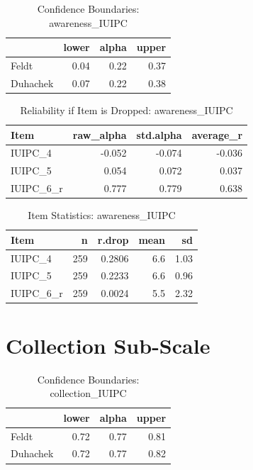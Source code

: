 \begin{table}[h]
\centering
\small
\caption{Confidence Boundaries: awareness\_IUIPC}
\label{tab:awareness_confidence}
\begin{tabular}{lrrr}
\toprule
 & \textbf{lower} & \textbf{alpha} & \textbf{upper} \\
\midrule
Feldt     & 0.04 & 0.22 & 0.37 \\
Duhachek  & 0.07 & 0.22 & 0.38 \\
\bottomrule
\end{tabular}
\end{table}

\begin{table}[h]
\centering
\small
\caption{Reliability if Item is Dropped: awareness\_IUIPC}
\label{tab:awareness_dropped}
\begin{tabular}{lrrr}
\toprule
\textbf{Item} & \textbf{raw\_alpha} & \textbf{std.alpha} & \textbf{average\_r} \\
\midrule
IUIPC\_4   & -0.052 & -0.074 & -0.036 \\
IUIPC\_5   & 0.054  & 0.072  & 0.037 \\
IUIPC\_6\_r & 0.777  & 0.779  & 0.638 \\
\bottomrule
\end{tabular}
\end{table}

\begin{table}[h]
\centering
\small
\caption{Item Statistics: awareness\_IUIPC}
\label{tab:awareness_items}
\begin{tabular}{lrrrr}
\toprule
\textbf{Item} & \textbf{n} & \textbf{r.drop} & \textbf{mean} & \textbf{sd} \\
\midrule
IUIPC\_4   & 259 & 0.2806 & 6.6 & 1.03 \\
IUIPC\_5   & 259 & 0.2233 & 6.6 & 0.96 \\
IUIPC\_6\_r & 259 & 0.0024 & 5.5 & 2.32 \\
\bottomrule
\end{tabular}
\end{table} 


\section{Collection Sub-Scale} \label{collection_IUIPC}

\begin{table}[h]
\centering
\small
\caption{Confidence Boundaries: collection\_IUIPC}
\label{tab:collection_confidence}
\begin{tabular}{lrrr}
\toprule
 & \textbf{lower} & \textbf{alpha} & \textbf{upper} \\
\midrule
Feldt     & 0.72 & 0.77 & 0.81 \\
Duhachek  & 0.72 & 0.77 & 0.82 \\
\bottomrule
\end{tabular}
\end{table}

